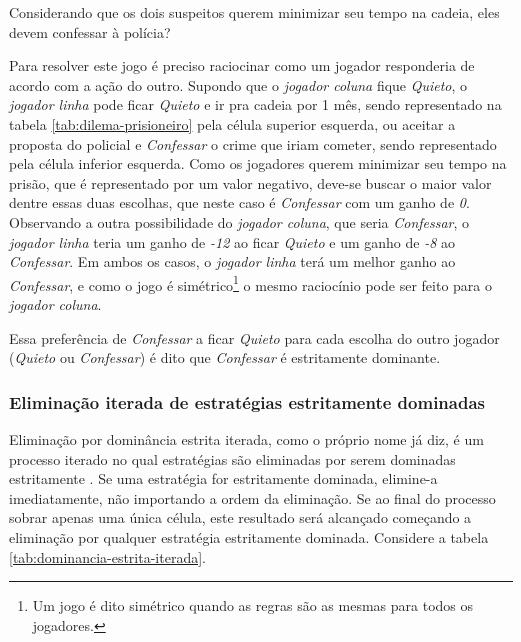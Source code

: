 Considerando que os dois suspeitos querem minimizar seu tempo na cadeia, eles devem confessar à polícia?

Para resolver este jogo é preciso raciocinar como um jogador responderia de acordo com a ação do outro. Supondo que o \emph{jogador coluna} fique \emph{Quieto}, o \emph{jogador linha} pode ficar \emph{Quieto} e ir pra cadeia por 1 mês, sendo representado na tabela \ref{tab:dilema-prisioneiro} pela célula superior esquerda, ou aceitar a proposta do policial e \emph{Confessar} o crime que iriam cometer, sendo representado pela célula inferior esquerda. Como os jogadores querem minimizar seu tempo na prisão, que é representado por um valor negativo, deve-se buscar o maior valor dentre essas duas escolhas, que neste caso é \emph{Confessar} com um ganho de \emph{0}. Observando a outra possibilidade do \emph{jogador coluna}, que seria \emph{Confessar}, o \emph{jogador linha} teria um ganho de \emph{-12} ao ficar \emph{Quieto} e um ganho de \emph{-8} ao \emph{Confessar}. Em ambos os casos, o \emph{jogador linha} terá um melhor ganho ao \emph{Confessar}, e como o jogo é simétrico\footnote{Um jogo é dito simétrico quando as regras são as mesmas para todos os jogadores.} o mesmo raciocínio pode ser feito para o \emph{jogador coluna}.

Essa preferência de \emph{Confessar} a ficar \emph{Quieto} para cada escolha do outro jogador (\emph{Quieto} ou \emph{Confessar}) é dito que \emph{Confessar} é estritamente dominante.

\subsubsection{Eliminação iterada de estratégias estritamente dominadas}

Eliminação por dominância estrita iterada, como o próprio nome já diz, é um processo iterado no qual estratégias são eliminadas por serem dominadas estritamente \cite{spaniel_2011}. Se uma estratégia for estritamente dominada, elimine-a imediatamente, não importando a ordem da eliminação. Se ao final do processo sobrar apenas uma única célula, este resultado será alcançado começando a eliminação por qualquer estratégia estritamente dominada. Considere a tabela \ref{tab:dominancia-estrita-iterada}.

